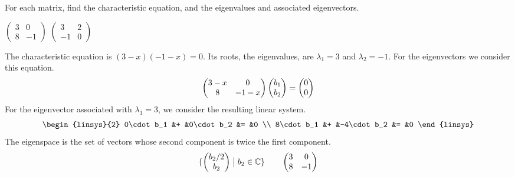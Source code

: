 \begin{exercises}
  \recommended \item
    For each matrix, find the characteristic equation, and the
    eigenvalues and associated eigenvectors.
    \begin{exparts*}
      \partsitem \( \begin{pmatrix}
                  3  &0  \\
                  8  &-1
            \end{pmatrix}  \)
      \partsitem \( \begin{pmatrix}
                  3  &2  \\
                 -1  &0
            \end{pmatrix}  \)
    \end{exparts*}
    \begin{answer}
       \begin{exparts}
         \partsitem The characteristic equation is \( (3-x)(-1-x)=0 \).
           Its roots, the eigenvalues, are \( \lambda_1=3 \) and 
           \( \lambda_2=-1 \).
           For the eigenvectors we consider this equation.
           \begin{equation*}
             \begin{pmatrix}
               3-x  &0    \\
               8    &-1-x
             \end{pmatrix}
             \begin{pmatrix} b_1  \\  b_2 \end{pmatrix}
             =\begin{pmatrix} 0  \\  0 \end{pmatrix}
           \end{equation*}
           For the eigenvector associated with $\lambda_1=3$,
           we consider the resulting linear system.
           \begin{equation*}
             \begin{linsys}{2}
               0\cdot b_1  &+  &0\cdot b_2  &=  &0  \\
               8\cdot b_1  &+  &-4\cdot b_2 &=  &0
             \end{linsys}
           \end{equation*}
           The eigenspace is the set of vectors whose second component is 
           twice the first component.
           \begin{equation*}
             \mbox{$\{\begin{pmatrix} b_2/2 \\ b_2 \end{pmatrix}\bigm| b_2\in\mathbb{C}\}$}
             \qquad
             \begin{pmatrix}
               3  &0  \\
               8  &-1

\end{pmatrix}
\end{equation*}
\end{exparts}
\end{answer}
\end{exercises}
